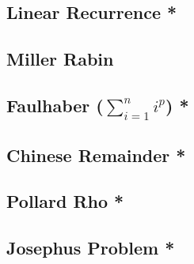 \documentclass[a4paper,10pt,twocolumn,oneside]{article}
\begin{document}
% 

\subsection{Linear Recurrence *}


\subsection{Miller Rabin}


% 

\subsection{Faulhaber ($\sum\limits_{i=1}^{n}i^p$) *}


\subsection{Chinese Remainder *}


\subsection{Pollard Rho *}


\subsection{Josephus Problem *}


%

%
\end{document}
